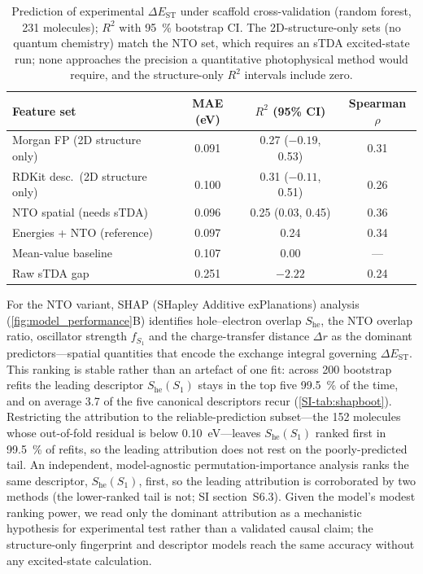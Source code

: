 \begin{table}[htbp]
  \centering
  \caption{Prediction of experimental $\Delta E_\text{ST}$ under scaffold
    cross-validation (random forest, \num{231} molecules); $R^2$ with \qty{95}{\percent}
    bootstrap CI. The 2D-structure-only sets (no quantum chemistry) match the
    NTO set, which requires an sTDA excited-state run; none approaches the
    precision a quantitative photophysical method would require, and the
    structure-only $R^2$ intervals include zero.}
  \label{tab:feature_comparison}
  \begin{tabular}{lccc}
    \toprule
    Feature set & MAE (eV) & $R^2$ (95\% CI) & Spearman $\rho$ \\
    \midrule
    Morgan FP (2D structure only)   & 0.091 & 0.27 ($-0.19$, 0.53) & 0.31 \\
    RDKit desc.\ (2D structure only) & 0.100 & 0.31 ($-0.11$, 0.51) & 0.26 \\
    NTO spatial (needs sTDA)        & 0.096 & 0.25 (0.03, 0.45) & 0.36 \\
    Energies + NTO (reference)      & 0.097 & 0.24 & 0.34 \\
    \midrule
    Mean-value baseline             & 0.107 & 0.00 & --- \\
    Raw sTDA gap                    & 0.251 & $-2.22$ & 0.24 \\
    \bottomrule
  \end{tabular}
\end{table}

For the NTO variant, SHAP (SHapley Additive exPlanations) analysis
(\cref{fig:model_performance}B) identifies
hole--electron overlap $S_\text{he}$, the NTO overlap ratio, oscillator strength
$f_{S_1}$ and the charge-transfer distance $\Delta r$ as the dominant
predictors---spatial quantities that encode the exchange integral governing
$\Delta E_\text{ST}$. This ranking is stable rather than an artefact of one fit:
across \num{200} bootstrap refits the leading descriptor $S_\text{he}(S_1)$ stays
in the top five \qty{99.5}{\percent} of the time, and on average \num{3.7} of the
five canonical descriptors recur (\cref{SI-tab:shapboot}). Restricting the attribution to
the reliable-prediction subset---the \num{152} molecules whose out-of-fold residual is
below \qty{0.10}{\electronvolt}---leaves $S_\text{he}(S_1)$ ranked first in
\qty{99.5}{\percent} of refits, so the leading attribution does not rest on the
poorly-predicted tail. An independent, model-agnostic permutation-importance analysis ranks the same
descriptor, $S_\text{he}(S_1)$, first, so the leading attribution is corroborated by
two methods (the lower-ranked tail is not; SI section~S6.3). Given the model's modest
ranking power, we read only the dominant attribution as a mechanistic hypothesis for
experimental test rather than a validated causal claim; the structure-only
fingerprint and descriptor models reach the same accuracy without any excited-state
calculation.

